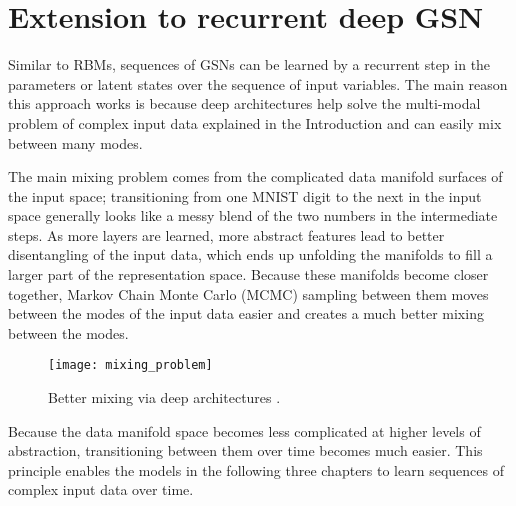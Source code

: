 \section{Extension to recurrent deep GSN}

Similar to RBMs, sequences of GSNs can be learned by a recurrent step in the parameters or latent states over the sequence of input variables. The main reason this approach works is because deep architectures help solve the multi-modal problem of complex input data explained in the Introduction and can easily mix between many modes.

The main mixing problem comes from the complicated data manifold surfaces of the input space; transitioning from one MNIST digit to the next in the input space generally looks like a messy blend of the two numbers in the intermediate steps. As more layers are learned, more abstract features lead to better disentangling of the input data, which ends up unfolding the manifolds to fill a larger part of the representation space. Because these manifolds become closer together, Markov Chain Monte Carlo (MCMC) sampling between them moves between the modes of the input data easier and creates a much better mixing between the modes.

\begin{figure}[h!]
  \centering
    \texttt{[image: mixing\_problem]}
\caption{Better mixing via deep architectures \cite{bengio_workshop}.}
\end{figure}

Because the data manifold space becomes less complicated at higher levels of abstraction, transitioning between them over time becomes much easier. This principle enables the models in the following three chapters to learn sequences of complex input data over time.


